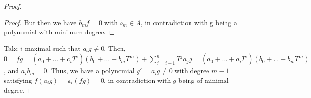 \begin{problem}
\begin{enumerate}[label=(\theproblem.\arabic*),ref=\theproblem.\arabic*]
\begin{sol}
\begin{proof}
\begin{claim}
\begin{proof}
                            But then we have $b_m f = 0$ with $b_m \in A$, in contradiction with g being a polynomial with minimum degree.
                        \end{proof}
                    \end{claim}
                    Take $i$ maximal such that $a_i g \neq 0$.
                    Then, $0 = f g = (a_0 + \dots + a_i T^i) (b_0 + \dots + b_m T^m) + \sum_{j=i+1}^n T^j a_j g = (a_0 + \dots + a_i T^i) (b_0 + \dots + b_m T^m)$, and $a_i b_m = 0$.
                    Thus, we have a polynomial $g' = a_i g \neq 0$ with degree $m-1$ satisfying $f (a_i g) = a_i (f g) = 0$, in contradiction with $g$ being of minimal degree.
                \end{proof}
            \end{sol}
    \end{enumerate}
\end{problem}